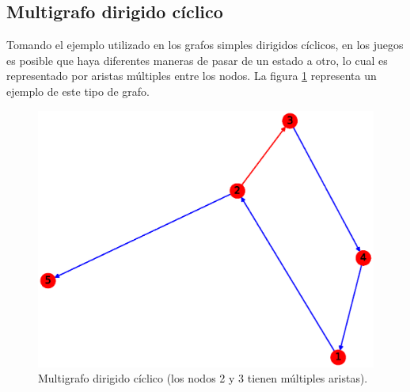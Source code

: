 \documentclass{article}
\begin{document}
\subsection{Multigrafo dirigido cíclico}
Tomando el ejemplo utilizado en los grafos simples dirigidos cíclicos, en los juegos es posible que haya diferentes maneras de pasar de un estado a otro, lo cual es representado por aristas múltiples entre los nodos. La figura \ref{fig:MDC} representa un ejemplo de este tipo de grafo.
\begin{figure}[H]
    \includegraphics[width=\textwidth]{11-MDC}
    \caption{Multigrafo dirigido cíclico (los nodos 2 y 3 tienen múltiples aristas).}
    \label{fig:MDC}
\end{figure}
\end{document}
